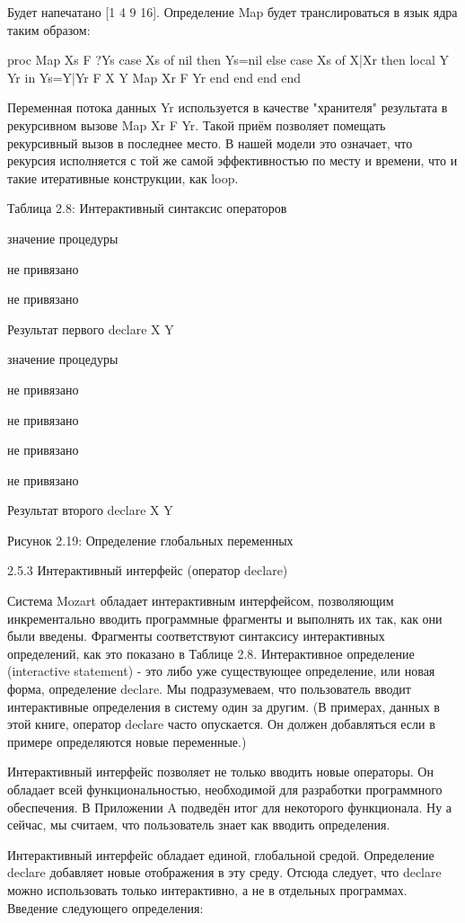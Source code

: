 Будет напечатано [1 4 9 16]. Определение Map будет транслироваться в язык ядра таким образом:

proc {Map Xs F ?Ys}
case Xs of nil then Ys=nil
else case Xs of X|Xr then
local Y Yr in
Ys=Y|Yr
{F X Y}
{Map Xr F Yr}
end
end end
end

Переменная потока данных Yr используется в качестве "хранителя" результата в рекурсивном вызове {Map Xr F Yr}. Такой приём позволяет помещать рекурсивный вызов в последнее место. В нашей модели это означает, что рекурсия исполняется с той же самой эффективностью по месту и времени, что и такие итеративные конструкции, как loop.

Таблица 2.8: Интерактивный синтаксис операторов

значение процедуры

не привязано

не привязано

Результат первого declare X Y

значение процедуры

не привязано

не привязано

не привязано

не привязано

Результат второго declare X Y

Рисунок 2.19: Определение глобальных переменных

2.5.3 Интерактивный интерфейс (оператор declare)

Система Mozart обладает интерактивным интерфейсом, позволяющим инкрементально вводить программные фрагменты и выполнять их так, как они были введены. Фрагменты соответствуют синтаксису интерактивных определений, как это показано в Таблице 2.8. Интерактивное определение (interactive statement) - это либо уже существующее определение, или новая форма, определение declare. Мы подразумеваем, что пользователь вводит интерактивные определения в систему один за другим. (В примерах, данных в этой книге, оператор declare часто опускается. Он должен добавляться если в примере определяются новые переменные.)

Интерактивный интерфейс позволяет не только вводить новые операторы. Он обладает всей функциональностью, необходимой для разработки программного обеспечения. В Приложении A подведён итог для некоторого функционала. Ну а сейчас, мы считаем, что пользователь знает как вводить определения.

Интерактивный интерфейс обладает единой, глобальной средой. Определение declare добавляет новые отображения в эту среду. Отсюда следует, что declare можно использовать только интерактивно, а не в отдельных программах. Введение следующего определения:

